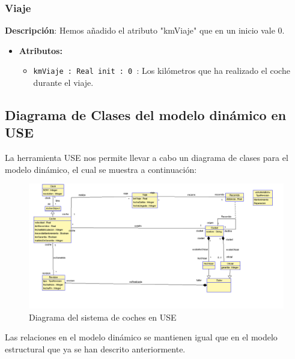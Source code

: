 \documentclass[12pt.a4paper]{article}
\begin{document}
\subsubsection{Viaje}
\textbf{Descripción}:  Hemos añadido el atributo "kmViaje" que en un inicio vale 0.
\begin{itemize}
    \item \textbf{Atributos:}
    \begin{itemize}
        \item \texttt{kmViaje : Real init : 0 }: Los kilómetros que ha realizado el coche durante el viaje.
    \end{itemize}
\end{itemize}

\subsection{Diagrama de Clases del modelo dinámico en USE}
La herramienta USE nos permite llevar a cabo un diagrama de clases para el modelo dinámico, el cual se muestra a continuación:
\begin{figure}[H]
     \includegraphics[width=1\linewidth]{diagramas/USE_B.png}
     \caption{Diagrama del sistema de coches en USE}
     \label{Diagrama del sistema de coches en USE}
\end{figure}

Las relaciones en el modelo dinámico se mantienen igual que en el modelo estructural que ya se han descrito anteriormente.
\end{document}
